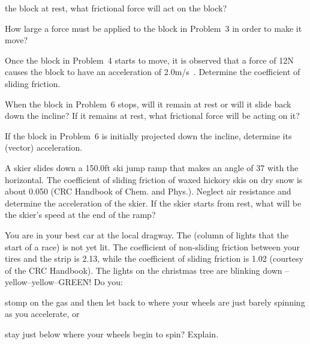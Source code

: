 {\begin{one-digit-list}
\item [3.] 

the block at rest, what frictional force will act on the block?

\item [4.] How large a force  must be applied to the block in Problem~3
in order to make it move?

\item [5.] Once the block in Problem~4 starts to move, it is observed that a
force  of 12\unit{N} causes the block to have an acceleration of 2.0\unit{m/s}.
Determine the coefficient of sliding friction.

\item [6.] 

\item [7.] When the block in Problem~6 stops, will it remain at rest or will
it slide back down the incline?
If it remains at rest, what frictional force will be acting on it?

\item [8.] If the block in Problem~6 is initially projected down the
incline, determine its (vector) acceleration.

\item [9.] A skier slides down a 150.0\unit{ft} ski jump ramp that makes an angle
of {37\degrees} with the horizontal.
The coefficient of sliding friction of waxed hickory skis on dry snow is
about 0.050 (CRC Handbook of Chem. and Phys.).
Neglect air resistance and determine the acceleration of the skier.
If the skier starts from rest, what will be the skier's speed at the end
of the ramp?

\item [10.] You are in your best car at the local dragway.
The  (column of lights that  the start of a
race) is not yet lit.
The coefficient of non-sliding friction between your tires and the strip is
2.13, while the coefficient of sliding friction is 1.02 (courtesy of the CRC
Handbook).
The lights on the christmas tree are blinking down --yellow--yellow--GREEN!
Do you:
\begin{one-digit-list}
\item [a.] stomp on the gas and then let back to where your wheels are just
barely spinning as you accelerate, or
\item [b.] stay just below where your wheels begin to spin?
Explain.
\end{one-digit-list}
\end{one-digit-list}

}
